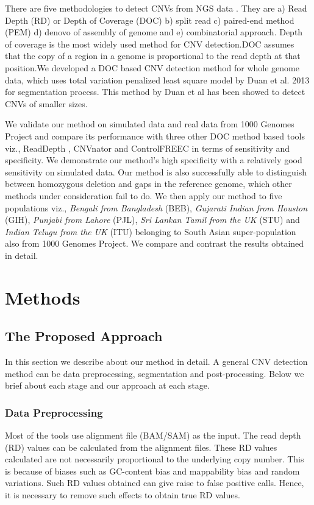 \documentclass[twocolumn,oneside,conference]
{IEEEtran}
\begin{document}
\par There are five methodologies to detect CNVs from NGS data \cite{11}. They are a) Read Depth (RD) or Depth of Coverage (DOC) b) split read c) paired-end method (PEM) d) denovo of assembly of genome and e) combinatorial approach. Depth of coverage is the most widely used method for CNV detection.DOC assumes that the copy of a region in a genome is proportional to the read depth at that position.We developed a DOC based CNV detection method for whole genome data, which uses total variation penalized least square model by Duan et al. 2013 \cite{12} for segmentation process. This method by Duan et al has been showed to detect CNVs of smaller sizes. 
\par We validate our method on simulated data and real data from 1000 Genomes Project \cite{16} and compare its  performance with three other DOC method based tools viz., ReadDepth \cite{13}, CNVnator \cite{14} and ControlFREEC \cite{15} in terms of sensitivity and specificity. We demonstrate our method's high specificity with a relatively good sensitivity on simulated data. Our method is also successfully able to distinguish between homozygous deletion and gaps in the reference genome, which other methods under consideration fail to do. We then apply our method to five populations viz.,\textit{ Bengali from Bangladesh} (BEB), \textit{Gujarati Indian from Houston} (GIH), \textit{Punjabi from Lahore} (PJL), \textit{Sri Lankan Tamil from the UK} (STU) and \textit{Indian Telugu from the UK} (ITU) belonging to South Asian super-population also from 1000 Genomes Project. We compare and contrast the results obtained in detail. 

\section{Methods}
\subsection{The Proposed Approach}
In this section we describe about our method in detail. A general CNV detection method can be data preprocessing, segmentation and post-processing. Below we brief about each stage and our approach at each stage.
\subsubsection{Data Preprocessing}
Most of the tools use alignment file (BAM/SAM) as the input. The read depth (RD) values can be calculated from the alignment files. These RD values calculated are not necessarily proportional to the underlying copy number. This is because of biases such as GC-content bias and mappability bias and random variations. Such RD values obtained can give raise to false positive calls. Hence, it is necessary to remove such effects to obtain true RD values. 
\end{document}
